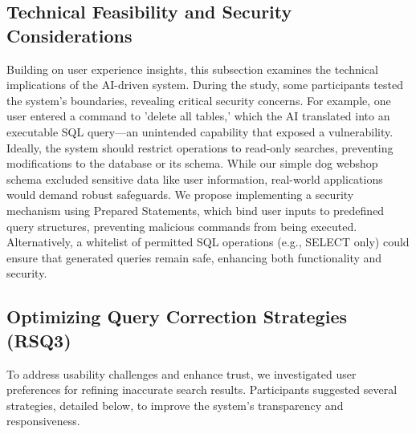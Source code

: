 \documentclass[../../submission.tex]{subfiles}
\begin{document}
 \subsection{Technical Feasibility and Security Considerations}
 Building on user experience insights, this subsection examines the technical implications 
 of the AI-driven system. During the study, some participants tested the system’s boundaries, 
 revealing critical security concerns. For example, one user entered a command to 'delete 
 all tables,' which the AI translated into an executable SQL query—an unintended capability 
 that exposed a vulnerability. Ideally, the system should restrict operations to read-only 
 searches, preventing modifications to the database or its schema. While our simple dog 
 webshop schema excluded sensitive data like user information, real-world applications 
 would demand robust safeguards. We propose implementing a security mechanism using 
 Prepared Statements, which bind user inputs to predefined query structures, preventing 
 malicious commands from being executed. Alternatively, a whitelist of permitted SQL 
 operations (e.g., SELECT only) could ensure that generated queries remain safe, enhancing 
 both functionality and security.
 
 \subsection{Optimizing Query Correction Strategies (RSQ3)}
 To address usability challenges and enhance trust, we investigated user preferences 
 for refining inaccurate search results. Participants suggested several strategies, 
 detailed below, to improve the system’s transparency and responsiveness.
\end{document}
